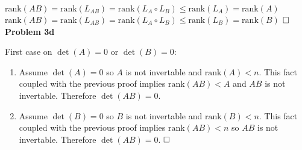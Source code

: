 \documentclass[fleqn]{article}
\newcommand{\problem}[1]{\large\textbf{Problem #1}\normalsize}
\newcommand{\qed}{\hfill\ensuremath{\square}}
\newcommand{\rankF}[1]{\ensuremath{\text{rank}(#1)}}
\begin{document}
$\rankF{AB} = \rankF{L_{AB}} = \rankF{L_A \circ L_B} \leq \rankF{L_A} =
\rankF{A}$ \\

$\rankF{AB} = \rankF{L_{AB}} = \rankF{L_A \circ L_B} \leq \rankF{L_B} = \rankF{B}$
$\qed$ \\

\problem{3d}

First case on $\det(A) = 0$ or $\det(B) = 0$:
\begin{enumerate}[label=\roman*:]
\item Assume $\det(A) = 0$ so $A$ is not invertable and $\rankF{A} < n$.
  This fact coupled with the previous proof implies $\rankF{AB} < A$ and $AB$ is
  not invertable. Therefore $\det(AB) = 0$.
\item Assume $\det(B) = 0$ so $B$ is not invertable and $\rankF{B} < n$.
  This fact coupled with the previous proof implies $\rankF{AB} < n$ so $AB$ is
  not invertable. Therefore $\det(AB) = 0$. $\qed$
\end{enumerate}
\end{document}
